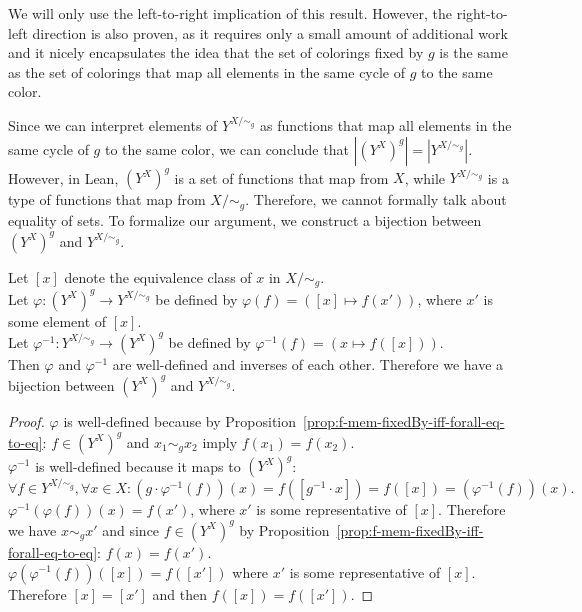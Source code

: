 We will only use the left-to-right implication of this result. However, the right-to-left direction is also proven, as it requires only a small amount of additional work and it nicely encapsulates the idea that the set of colorings fixed by $g$ is the same as the set of colorings that map all elements in the same cycle of $g$ to the same color.

Since we can interpret elements of $Y^{X/\sim_g}$ as functions that map all elements in the same cycle of $g$ to the same color, we can conclude that $|(Y^X)^g| = |Y^{X/\sim_g}|$. However, in Lean, $(Y^X)^g$ is a set of functions that map from $X$, while $Y^{X/\sim_g}$ is a type of functions that map from $X/\sim_g$. Therefore, we cannot formally talk about equality of sets. To formalize our argument, we construct a bijection between $(Y^X)^g$ and $Y^{X/\sim_g}$.

\begin{proposition}
  \label{prop:equiv-of-fixedBy-coloring-of-cycle-coloring}
  \leanok
  Let $[x]$ denote the equivalence class of $x$ in $X/\sim_g$.\\
  Let $\varphi : (Y^X)^g \to Y^{X/\sim_g}$ be defined by $\varphi(f) = ([x] \mapsto f(x'))$, where $x'$ is some element of $[x]$.\\
  Let $\varphi^{-1} : Y^{X/\sim_g} \to (Y^X)^g$ be defined by $\varphi^{-1}(f) = (x \mapsto f([x]))$.\\
  Then $\varphi$ and $\varphi^{-1}$ are well-defined and inverses of each other. Therefore we have a bijection between $(Y^X)^g$ and $Y^{X/\sim_g}$.
\end{proposition}

\begin{proof}
  \leanok
  $\varphi$ is well-defined because by Proposition~\ref{prop:f-mem-fixedBy-iff-forall-eq-to-eq}: $f \in (Y^X)^g$ and $x_1 \sim_g x_2$ imply $f(x_1) = f(x_2)$.\\
  $\varphi^{-1}$ is well-defined because it maps to $(Y^X)^g$:
  \begin{equation*}
    \forall f \in Y^{X/\sim_g}, \forall x \in X: (g \cdot \varphi^{-1}(f))(x) = f([g^{-1} \cdot x]) = f([x]) = (\varphi^{-1}(f))(x).
  \end{equation*}
  $\varphi^{-1}(\varphi(f))(x) = f(x')$, where $x'$ is some representative of $[x]$. Therefore we have $x \sim_g x'$ and since $f \in (Y^X)^g$ by Proposition~\ref{prop:f-mem-fixedBy-iff-forall-eq-to-eq}: $f(x) = f(x')$.\\
  $\varphi(\varphi^{-1}(f))([x]) = f([x'])$ where $x'$ is some representative of $[x]$. Therefore $[x] = [x']$ and then $f([x]) = f([x'])$.
\end{proof}

